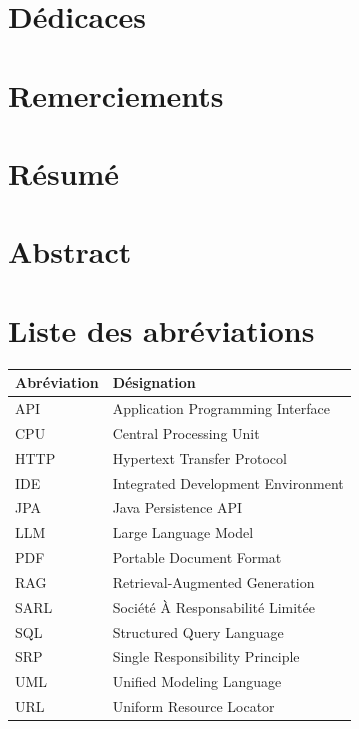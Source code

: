 \documentclass[12pt,a4paper]{report}
\begin{document}
	\pagestyle{empty} 
	
	\chapter*{Dédicaces}
	
	\chapter*{Remerciements}
	
	\chapter*{Résumé}
	
	\chapter*{Abstract}
	
	\chapter*{Liste des abréviations}
	
	\begin{table}[htbp]
		\centering
		\begin{tabular}{|l|l|}
			\hline
			\textbf{Abréviation} & \textbf{Désignation} \\
			\hline
			API & Application Programming Interface \\
			\hline
			CPU & Central Processing Unit \\
			\hline
			HTTP & Hypertext Transfer Protocol \\
			\hline
			IDE & Integrated Development Environment \\
			\hline
			JPA & Java Persistence API \\
			\hline
			LLM & Large Language Model \\
			\hline
			PDF & Portable Document Format \\
			\hline
			RAG & Retrieval-Augmented Generation \\
			\hline
			SARL & Société À Responsabilité Limitée \\
			\hline
			SQL & Structured Query Language \\
			\hline
			SRP & Single Responsibility Principle \\
			\hline
			UML & Unified Modeling Language \\
			\hline
			URL & Uniform Resource Locator \\
			\hline
		\end{tabular}
		\label{tab:liste-abréviations}
	\end{table}
	
\end{document}
